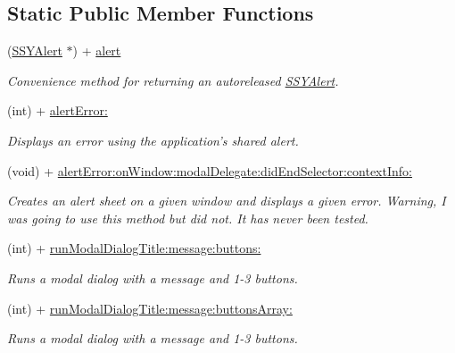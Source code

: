 \subsection*{Static Public Member Functions}
\begin{CompactItemize}
\item 
(\hyperlink{interface_s_s_y_alert}{SSYAlert} $\ast$) + \hyperlink{interface_s_s_y_alert_2af19780d34ceac4d2900b5f8c2178fe}{alert}
\begin{CompactList}\small\item\em Convenience method for returning an autoreleased \hyperlink{interface_s_s_y_alert}{SSYAlert}. \item\end{CompactList}\item 
(int) + \hyperlink{interface_s_s_y_alert_5665fce58be755ad7d1e1ed5461512c5}{alertError:}
\begin{CompactList}\small\item\em Displays an error using the application's shared alert. \item\end{CompactList}\item 
(void) + \hyperlink{interface_s_s_y_alert_f30ca2fe3aef894f71d33c031b57cae5}{alertError:onWindow:modalDelegate:didEndSelector:contextInfo:}
\begin{CompactList}\small\item\em Creates an alert sheet on a given window and displays a given error. Warning, I was going to use this method but did not. It has never been tested. \item\end{CompactList}\item 
(int) + \hyperlink{interface_s_s_y_alert_d39a91c4b93852513a2e0306a9c81041}{runModalDialogTitle:message:buttons:}
\begin{CompactList}\small\item\em Runs a modal dialog with a message and 1-3 buttons. \item\end{CompactList}\item 
(int) + \hyperlink{interface_s_s_y_alert_8e294391f819c1e888b41adb2f5ece52}{runModalDialogTitle:message:buttonsArray:}
\begin{CompactList}\small\item\em Runs a modal dialog with a message and 1-3 buttons. \item\end{CompactList}\item 

\end{CompactItemize}
